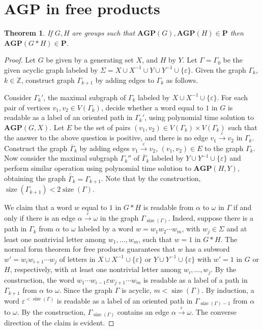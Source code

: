 \documentclass[10pt]{amsart}
\newtheorem{theorem}{Theorem}[section]
\theoremstyle{definition}
\DeclareMathOperator{\size}{{size}}
\def\P{{\mathbf{P}}}
\def\AGP{{\mathbf{AGP}}}
\begin{document}
\section{$\AGP$ in free products}\label{sec:free_prod}
\begin{theorem}
If $G,H$ are groups such that $\AGP(G),\AGP(H)\in\P$ then $\AGP(G*H)\in\P$.
\end{theorem}
\begin{proof}
Let $G$ be given by a generating set $X$, and $H$ by $Y$. Let $\Gamma=\Gamma_0$ be the given acyclic graph labeled by $\Sigma=X\cup X^{-1}\cup Y\cup Y^{-1}\cup\{\varepsilon\}$. Given the graph $\Gamma_k$, $k\in\mathbb Z$, construct graph $\Gamma_{k+1}$ by adding edges to $\Gamma_k$ as follows.

Consider $\Gamma_{k}'$, the maximal subgraph of $\Gamma_k$ labeled by  $X\cup X^{-1}\cup \{\varepsilon\}$.
For each pair of vertices $v_1,v_2\in V(\Gamma_k)$, decide whether a word equal to $1$ in $G$ is readable as a label of an oriented path in $\Gamma_k'$, using polynomial time solution to $\AGP(G,X)$.
Let $E$ be the set of pairs $(v_1,v_2)\in V(\Gamma_k)\times V(\Gamma_k)$ such that the answer to the above question is positive, and there is no edge $v_1\overset{\varepsilon}{\to}v_2$ in $\Gamma_k.$ Construct the graph $\overline{\Gamma}_k$ by adding edges  $v_1\overset{\varepsilon}{\to}v_2$, $(v_1,v_2)\in E$ to the graph $\Gamma_k$.
Now consider the maximal subgraph $\Gamma_k''$ of $\overline{\Gamma}_k$ labeled by $Y\cup Y^{-1}\cup \{\varepsilon\}$ and perform similar operation using polynomial time solution to $\AGP(H,Y)$, obtaining the graph $\overline{\overline{\Gamma}}_k=\Gamma_{k+1}$.
Note that by the construction, $\size(\Gamma_{k+1})<2\size(\Gamma)$.

We claim that a word $w$ equal to $1$ in $G*H$ is readable from $\alpha$ to $\omega$ in $\Gamma$ if and only if there is an edge $\alpha\overset{\varepsilon}{\to}\omega$ in the graph $\Gamma_{\size(\Gamma)}$.
Indeed, suppose there is a path in $\Gamma_k$ from $\alpha$ to $\omega$ labeled by a word $w=w_1w_2\cdots w_m$, with $w_j\in \Sigma$ and at least one nontrivial letter among $w_1,\ldots, w_m$, such that $w=1$ in $G*H$.
The normal form theorem for free products guarantees that $w$ has a subword $w'=w_iw_{i+1}\cdots w_j$ of letters in $X\cup X^{-1}\cup \{\varepsilon\}$ or $Y\cup Y^{-1}\cup \{\varepsilon\}$ with $w'=1$ in $G$ or $H$, respectively, with at least one nontrivial letter among $w_i,\ldots,w_j$.
By the construction, the word $w_1\cdots w_{i-1}\varepsilon w_{j+1}\cdots w_m$ is readable as a label of a path in $\Gamma_{k+1}$ from $\alpha$ to $\omega$. Since the graph $\Gamma$ is acyclic, $m< \size(\Gamma)$.
By induction, a word $\varepsilon^{<\size(\Gamma)}$ is readable as a label of an oriented path in $\Gamma_{\size(\Gamma)-1}$ from $\alpha$ to $\omega$.
By the construction, $\Gamma_{\size(\Gamma)}$ contains an edge $\alpha\overset{\varepsilon}{\to}\omega$.
The converse direction of the claim is evident.
\end{proof}
\end{document}
